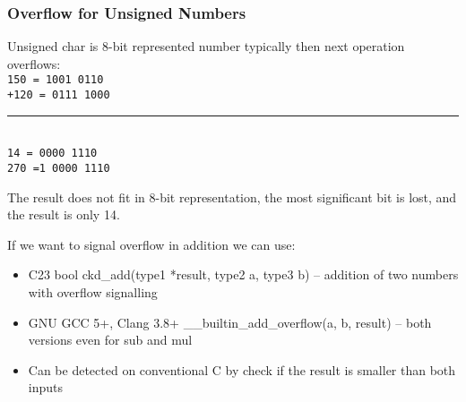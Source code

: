 \documentclass{beamer}
\begin{document}
\begin{frame}
\frametitle{Overflow for Unsigned Numbers}


Unsigned char is 8-bit represented number typically then next operation overflows:\\
\texttt{\phantom{x}150 = \phantom{x}1001 0110}\\
\texttt{+120 = \phantom{x}0111 1000}\vspace{-6pt}\\
\rule[0pt]{3.6cm}{0.4pt}\\
\texttt{\phantom{xx}14 = \phantom{x}0000 1110}\\
\texttt{\phantom{x}270 =1 0000 1110}

The result does not fit in 8-bit representation, the most significant bit is lost, and the result is only 14.

If we want to signal overflow in addition we can use:
\begin{itemize}
\item C23 bool ckd\_add(type1 *result, type2 a, type3 b) -- addition of two numbers with overflow signalling
\item GNU GCC 5+, Clang 3.8+ \_\_builtin\_add\_overflow(a, b, result) -- both versions even for sub and mul
\item Can be detected on conventional C by check if the result is smaller than both inputs
\end{itemize}
\end{frame}
\end{document}
